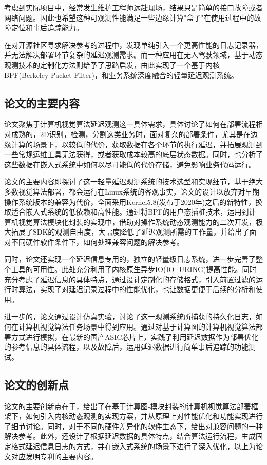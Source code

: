 \documentclass[master]{shtthesis}
\begin{document}
考虑到实际项目中，经常发生维护工程师远赴现场，结果只是简单的接口故障或者网络问题。因此也希望这种可观测性能满足一些边缘计算"盒子"在使用过程中的故障定位和事后追踪能力。

在对开源社区寻求解决参考的过程中，发现单纯引入一个更高性能的日志记录器，并无法解决部署环节复杂的延迟观测需求。而一种应用在无人驾驶领域，基于动态观测技术的定制化方法\cite{bpfgpu}则给予了思路启发，由此实现了一个基于内核BPF(Berkeley Packet Filter)\cite{mccanne1993bsd}，和业务系统深度融合的轻量延迟观测系统。
\subsection{论文的主要内容}\label{论文的主要内容}
论文聚焦于计算机视觉算法延迟观测这一具体需求，具体讨论了如何在部署流程相对成熟的，2D识别，检测，分割这类业务时，面对复杂的部署条件，尤其是在边缘计算的场景下，以较低的代价，获取数据在各个环节的执行延迟，并拓展观测到一些常规运维工具无法获得，或者获取成本较高的底层状态数据。同时，也分析了这些数据在嵌入式系统中如何以尽可能低的代价存储，避免影响业务代码运行。

论文的主要内容即探讨了这一轻量延迟观测系统的技术选型和实现细节，基于绝大多数视觉算法部署，都会运行在Linux系统的客观事实，论文的设计以放弃对早期操作系统版本的兼容为代价，全面采用Kernel5.8(发布于2020年)\cite{bpfring}之后的新特性，换取适合嵌入式系统的低依赖和高性能。通过将BPF的用户态插桩技术，运用到计算机视觉算法模块化封装的实现中，借助对操作系统动态观测能力的二次开发，极大拓展了SDK的观测自由度，大幅度降低了延迟观测所需的工作量，并给出了面对不同硬件软件条件下，如何处理兼容问题的解决参考。

同时，论文还实现一个延迟信息专用的，独立的轻量级日志系统，进一步完善了整个工具的可用性。此处充分利用了内核原生异步IO(IO- URING)\cite{axboe2019efficient}提高性能。同时充分考虑了延迟信息的具体特点，通过设计定制化的存储格式，引入前置过滤的运行时算法，实现了对延迟记录过程中的性能优化，也让数据更便于后续的分析和使用。

进一步的，论文通过设计仿真实验，讨论了这一观测系统所捕获的持久化日志，如何在计算机视觉算法任务场景中得到应用。通过对基于计算图的计算机视觉算法部署方式进行模拟，在最新的国产ASIC芯片上，实践了利用延迟数据作为部署优化的参考信息的具体流程，以及故障后，运用延迟数据进行简单事后追踪的功能测试。

\subsection{论文的创新点}\label{论文的创新点}
论文的主要创新点在于，给出了在基于计算图-模块封装的计算机视觉算法部署框架下，如何引入内核动态观测的实现方案，并从原理上对性能优化和功能实现进行了细节讨论。同时，对于不同的硬件差异化的软件生态下，给出对兼容问题的一种解决参考。此外，还设计了根据延迟数据的具体特点，结合算法运行流程，生成固定格式延迟信息日志的方式，并在嵌入式系统的场景下进行了深入优化，以上为论文对应发明专利的主要内容\cite{patent}。
\end{document}

